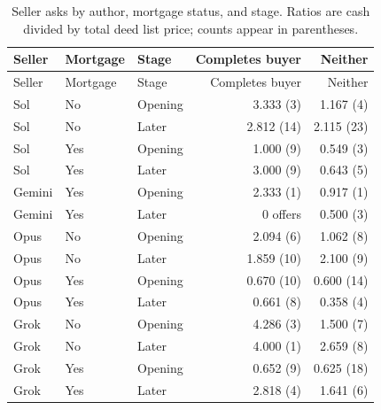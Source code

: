 \begin{longtable}{@{}lllrr@{}}
\caption{Seller asks by author, mortgage status, and stage. Ratios are cash divided by total deed list price; counts appear in parentheses.}\label{tab:pricecells}\\
\toprule Seller & Mortgage & Stage & Completes buyer & Neither\\\midrule\endfirsthead
\toprule Seller & Mortgage & Stage & Completes buyer & Neither\\\midrule\endhead
\bottomrule\endfoot
Sol & No & Opening & 3.333 (3) & 1.167 (4) \\
Sol & No & Later & 2.812 (14) & 2.115 (23) \\
Sol & Yes & Opening & 1.000 (9) & 0.549 (3) \\
Sol & Yes & Later & 3.000 (9) & 0.643 (5) \\
Gemini & Yes & Opening & 2.333 (1) & 0.917 (1) \\
Gemini & Yes & Later & 0 offers & 0.500 (3) \\
Opus & No & Opening & 2.094 (6) & 1.062 (8) \\
Opus & No & Later & 1.859 (10) & 2.100 (9) \\
Opus & Yes & Opening & 0.670 (10) & 0.600 (14) \\
Opus & Yes & Later & 0.661 (8) & 0.358 (4) \\
Grok & No & Opening & 4.286 (3) & 1.500 (7) \\
Grok & No & Later & 4.000 (1) & 2.659 (8) \\
Grok & Yes & Opening & 0.652 (9) & 0.625 (18) \\
Grok & Yes & Later & 2.818 (4) & 1.641 (6) \\
\end{longtable}
